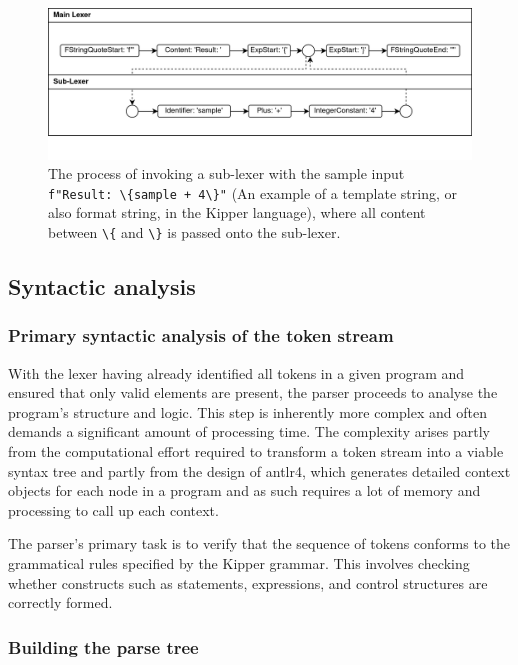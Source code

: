 \begin{figure}[h!]
	\centering
	\includegraphics[scale=0.85]{./pics/Sub-Lexer.drawio}
	\caption{The process of invoking a sub-lexer with the sample input \lstinline|f"Result: \{sample + 4\}"| (An example of a template string, or also format string, in the Kipper language), where all content between \lstinline|\{| and \lstinline|\}| is passed onto the sub-lexer.}
	\label{fig:implementation:sub-lexer}
\end{figure}

\subsection{Syntactic analysis}

\subsubsection{Primary syntactic analysis of the token stream}

With the lexer having already identified all tokens in a given program and ensured that only valid elements are present, the parser proceeds to analyse the program's structure and logic. This step is inherently more complex and often demands a significant amount of processing time. The complexity arises partly from the computational effort required to transform a token stream into a viable syntax tree and partly from the design of \Gls{antlr4}, which generates detailed context objects for each node in a program and as such requires a lot of memory and processing to call up each context.

The parser's primary task is to verify that the sequence of tokens conforms to the grammatical rules specified by the Kipper grammar. This involves checking whether constructs such as statements, expressions, and control structures are correctly formed.

\subsubsection{Building the parse tree}

